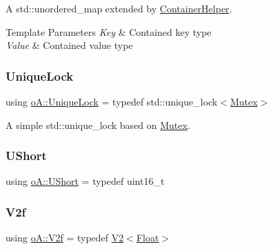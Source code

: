 A std\+::unordered\+\_\+map extended by \mbox{\hyperlink{classo_a_1_1_container_helper}{Container\+Helper}}. 


\begin{DoxyTemplParams}{Template Parameters}
{\em Key} & Contained key type \\
\hline
{\em Value} & Contained value type \\
\hline
\end{DoxyTemplParams}
\mbox{\label{namespaceo_a_a2a6e84e4843983460eace0e5ae899a1e}} 
\subsubsection{\texorpdfstring{Unique\+Lock}{UniqueLock}}
{\footnotesize\ttfamily using \mbox{\hyperlink{namespaceo_a_a2a6e84e4843983460eace0e5ae899a1e}{o\+A\+::\+Unique\+Lock}} = typedef std\+::unique\+\_\+lock$<$\mbox{\hyperlink{namespaceo_a_adc2c4dfe90e78df47ae2e677a4d0f9fa}{Mutex}}$>$}



A simple std\+::unique\+\_\+lock based on \mbox{\hyperlink{namespaceo_a_adc2c4dfe90e78df47ae2e677a4d0f9fa}{Mutex}}. 

\mbox{\label{namespaceo_a_a0e8a8217ae95045f36575875dcb54537}} 
\subsubsection{\texorpdfstring{U\+Short}{UShort}}
{\footnotesize\ttfamily using \mbox{\hyperlink{namespaceo_a_a0e8a8217ae95045f36575875dcb54537}{o\+A\+::\+U\+Short}} = typedef uint16\+\_\+t}

\mbox{\label{namespaceo_a_a6de6b1704d5ba4ceac954fdebaee0d79}} 
\subsubsection{\texorpdfstring{V2f}{V2f}}
{\footnotesize\ttfamily using \mbox{\hyperlink{namespaceo_a_a6de6b1704d5ba4ceac954fdebaee0d79}{o\+A\+::\+V2f}} = typedef \mbox{\hyperlink{structo_a_1_1_v2}{V2}}$<$\mbox{\hyperlink{namespaceo_a_a513e9cb16924b482268ab3fcdf1f2499}{Float}}$>$}

